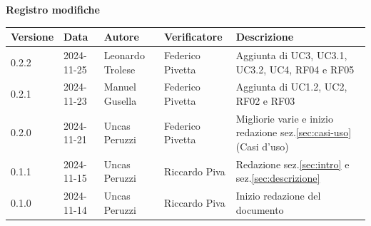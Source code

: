 \documentclass[11pt]{article}
\begin{document}
\centering\textbf{Registro modifiche}\\
\vspace{2mm}
\begin{tabularx}{\textwidth}{|l|l|l|l|X|}
\hline
\textbf{Versione} & \textbf{Data} & \textbf{Autore} & \textbf{Verificatore} & \textbf{Descrizione} \\
\hline
0.2.2 & 2024-11-25 & Leonardo Trolese  & Federico Pivetta & Aggiunta di UC3, UC3.1, UC3.2, UC4, RF04 e RF05 \\
\hline
0.2.1 & 2024-11-23 & Manuel Gusella  & Federico Pivetta & Aggiunta di UC1.2, UC2, RF02 e RF03 \\
\hline
0.2.0 & 2024-11-21 & Uncas Peruzzi  & Federico Pivetta & Migliorie varie e inizio redazione sez.\ref{sec:casi-uso} (Casi d'uso) \\
\hline
0.1.1 & 2024-11-15 & Uncas Peruzzi  & Riccardo Piva & Redazione sez.\ref{sec:intro} e sez.\ref{sec:descrizione} \\
\hline
0.1.0 & 2024-11-14 & Uncas Peruzzi  & Riccardo Piva & Inizio redazione del documento\\
\hline
\end{tabularx}
\newpage
\tableofcontents
\listoffigures %
\end{document}
